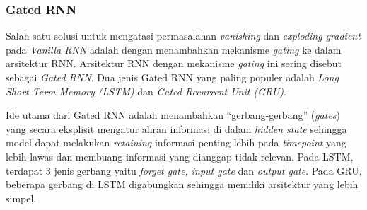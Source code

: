 \subsubsection{Gated RNN}

Salah satu solusi untuk mengatasi permasalahan \textit{vanishing} dan \textit{exploding gradient} pada \textit{Vanilla RNN} adalah dengan menambahkan mekanisme \textit{gating} ke dalam arsitektur RNN. Arsitektur RNN dengan mekanisme \textit{gating} ini sering disebut sebagai \textit{Gated RNN}. Dua jenis Gated RNN yang paling populer adalah \textit{Long Short-Term Memory (LSTM)} dan \textit{Gated Recurrent Unit (GRU)}.

Ide utama dari Gated RNN adalah menambahkan “gerbang-gerbang” (\textit{gates}) yang secara eksplisit mengatur aliran informasi di dalam \textit{hidden state} sehingga model dapat melakukan \textit{retaining} informasi penting lebih pada \textit{timepoint} yang lebih lawas dan membuang informasi yang dianggap tidak relevan. Pada LSTM, terdapat 3 jenis gerbang yaitu \textit{forget gate, input gate} dan \textit{output gate}. Pada GRU, beberapa gerbang di LSTM digabungkan sehingga memiliki arsitektur yang lebih simpel.

